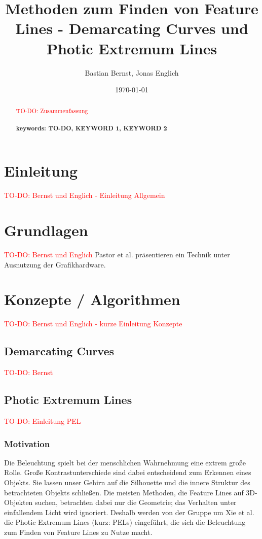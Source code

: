 \documentclass{paperStyle}
\title{Methoden zum Finden von Feature Lines - Demarcating Curves und Photic Extremum Lines}
\author{Bastian Bernst, Jonas Englich}
\date{\today}
\newcommand\todo[1]{\textcolor{red}{#1}}
\begin{document}
\maketitle

\begin{abstract}
   \todo{TO-DO: Zusammenfassung}\\
    \\
\textbf{keywords: TO-DO, KEYWORD 1, KEYWORD 2}

\end{abstract}

\section{Einleitung}
\todo{TO-DO: Bernst und Englich - Einleitung Allgemein}
\section{Grundlagen}
\todo{TO-DO: Bernst und Englich}
Pastor et al. \cite{Praun2001} präsentieren ein Technik unter Ausnutzung der Grafikhardware.

\section{Konzepte / Algorithmen}
\todo{TO-DO: Bernst und Englich - kurze Einleitung Konzepte}

\subsection{Demarcating Curves}
\todo{TO-DO: Bernst}

\subsection{Photic Extremum Lines}
\todo{TO-DO: Einleitung PEL}
\subsubsection{Motivation}
\label{motivationpel}
Die Beleuchtung spielt bei der menschlichen Wahrnehmung eine extrem große Rolle. Große Kontrastunterschiede sind dabei entscheidend zum Erkennen eines Objekts. Sie lassen unser Gehirn auf die Silhouette und die innere Struktur des betrachteten Objekts schließen. Die meisten Methoden, die Feature Lines auf 3D-Objekten suchen, betrachten dabei nur die Geometrie; das Verhalten unter einfallendem Licht wird ignoriert. Deshalb werden von der Gruppe um Xie et al. die Photic Extremum Lines (kurz: PELs) eingeführt, die sich die Beleuchtung zum Finden von Feature Lines zu Nutze macht.  
\end{document}
